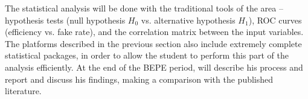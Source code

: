 \documentclass[12pt,a4paper]{sprace}
\begin{document}
The statistical analysis will be done with the traditional tools of the area -- hypothesis tests (null hypothesis $H_0$ vs. alternative hypothesis $H_1$), ROC curves (efficiency vs. fake rate), and the correlation matrix between the input variables. The platforms described in the previous section also include extremely complete statistical packages, in order to allow the student to perform this part of the analysis efficiently. At the end of the BEPE period, will describe his process and report and discuss his findings, making a comparison with the published literature.
\newpage\thispagestyle{empty}
{}
\end{document}
